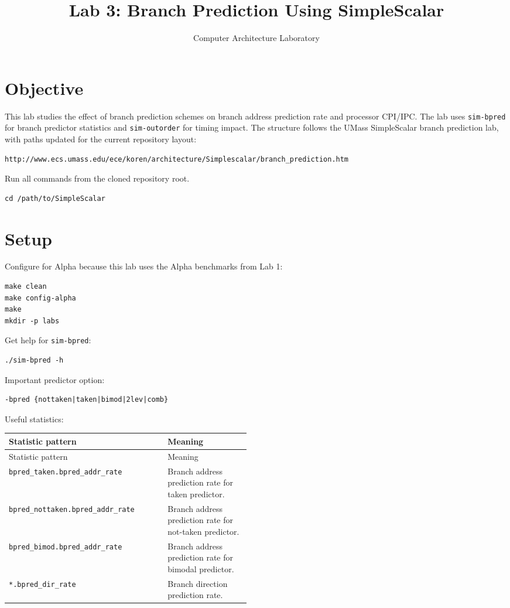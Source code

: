 \documentclass[11pt]{article}
\title{Lab 3: Branch Prediction Using SimpleScalar}
\author{Computer Architecture Laboratory}
\date{}
\begin{document}
\maketitle
\section{Objective}
This lab studies the effect of branch prediction schemes on branch address prediction rate and processor CPI/IPC. The lab uses \texttt{sim-bpred} for branch predictor statistics and \texttt{sim-outorder} for timing impact.
The structure follows the UMass SimpleScalar branch prediction lab, with paths updated for the current repository layout:
\begin{lstlisting}
http://www.ecs.umass.edu/ece/koren/architecture/Simplescalar/branch_prediction.htm
\end{lstlisting}
Run all commands from the cloned repository root.
\begin{lstlisting}
cd /path/to/SimpleScalar
\end{lstlisting}
\section{Setup}
Configure for Alpha because this lab uses the Alpha benchmarks from Lab 1:
\begin{lstlisting}
make clean
make config-alpha
make
mkdir -p labs
\end{lstlisting}
Get help for \texttt{sim-bpred}:
\begin{lstlisting}
./sim-bpred -h
\end{lstlisting}
Important predictor option:
\begin{lstlisting}
-bpred {nottaken|taken|bimod|2lev|comb}
\end{lstlisting}
Useful statistics:
\begin{center}
\scriptsize
\begin{longtable}{|p{0.24\linewidth}|p{0.24\linewidth}|}
\hline
Statistic pattern & Meaning \\
\hline
\endfirsthead
\hline
Statistic pattern & Meaning \\
\hline
\endhead
\texttt{bpred\_taken.bpred\_addr\_rate} & Branch address prediction rate for taken predictor. \\
\hline
\texttt{bpred\_nottaken.bpred\_addr\_rate} & Branch address prediction rate for not-taken predictor. \\
\hline
\texttt{bpred\_bimod.bpred\_addr\_rate} & Branch address prediction rate for bimodal predictor. \\
\hline
\texttt{*.bpred\_dir\_rate} & Branch direction prediction rate. \\
\hline
\end{longtable}
\normalsize
\end{center}
\end{document}
